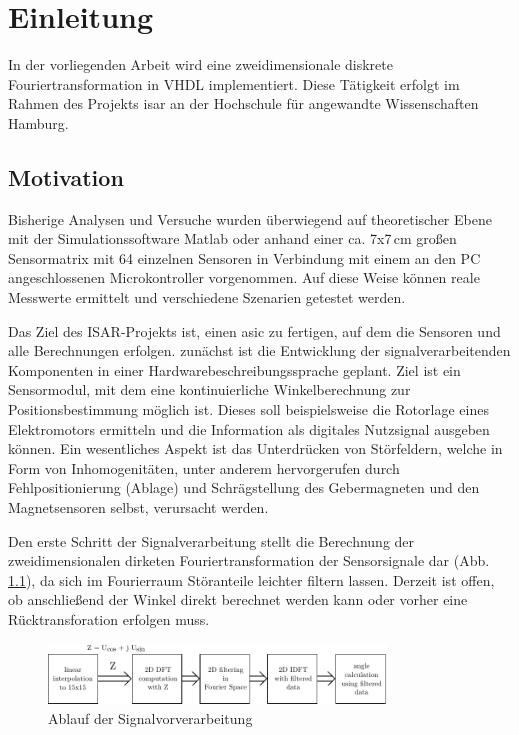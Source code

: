 \chapter{Einleitung}
In der vorliegenden Arbeit wird eine zweidimensionale diskrete Fouriertransformation in VHDL implementiert. Diese Tätigkeit erfolgt im Rahmen des Projekts \gls{isar} an der 
Hochschule für angewandte Wissenschaften Hamburg.
 \section{Motivation}
 Bisherige Analysen und Versuche wurden überwiegend auf theoretischer Ebene mit der Simulationssoftware Matlab oder anhand einer ca. 7x7\,cm großen Sensormatrix mit 64 einzelnen Sensoren in Verbindung mit
 einem an den PC angeschlossenen Microkontroller vorgenommen. Auf diese Weise können reale Messwerte ermittelt und verschiedene Szenarien getestet werden.
 
 Das Ziel des ISAR-Projekts ist, einen \gls{asic} zu fertigen, auf dem die Sensoren und alle Berechnungen erfolgen. 
 zunächst ist die Entwicklung der signalverarbeitenden Komponenten in einer Hardwarebeschreibungssprache geplant.
 Ziel ist ein Sensormodul, mit dem eine kontinuierliche Winkelberechnung zur Positionsbestimmung möglich ist. Dieses soll beispielsweise die Rotorlage eines Elektromotors ermitteln und die Information als digitales Nutzsignal ausgeben können. Ein wesentliches Aspekt ist das Unterdrücken von Störfeldern, welche in Form von Inhomogenitäten, unter anderem hervorgerufen durch Fehlpositionierung (Ablage) und Schrägstellung des Gebermagneten und den Magnetsensoren selbst, verursacht werden. 

 Den erste Schritt der Signalverarbeitung stellt die Berechnung der zweidimensionalen dirketen Fouriertransformation der Sensorsignale dar (Abb. \ref{pic:AblaufFourier}), da sich im Fourierraum Störanteile leichter filtern lassen. 
 Derzeit ist offen, ob anschließend der Winkel direkt berechnet werden kann oder vorher eine Rücktransforation erfolgen muss.
 

\begin{figure}[ht!]
 \centering
 \includegraphics[width=0.8\textwidth]{img/AblaufFourier.pdf}
 \caption{Ablauf der Signalvorverarbeitung~\autocite[9]{krrts2017freqfilt}}
 \label{pic:AblaufFourier}
\end{figure}


